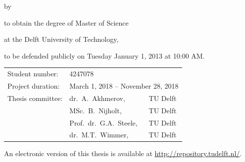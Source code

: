 \begin{titlepage}


\begin{center}


{\makeatletter
\largetitlestyle\fontsize{64}{94}\selectfont\@title
\makeatother}

{\makeatletter
\ifx\@subtitle\undefined\else
    \bigskip
   {\tudsffamily\fontsize{22}{32}\selectfont\@subtitle}    
\fi
\makeatother}

\bigskip
\bigskip

by

\bigskip
\bigskip

{\makeatletter
\largetitlestyle\fontsize{26}{26}\selectfont\@author
\makeatother}

\bigskip
\bigskip

to obtain the degree of Master of Science

at the Delft University of Technology,

to be defended publicly on Tuesday January 1, 2013 at 10:00 AM.

\vfill

\begin{tabular}{lll}
    Student number: & 4247078 \\
    Project duration: & \multicolumn{2}{l}{March 1, 2018 -- November 28, 2018} \\
    Thesis committee: & dr.\ A.\ Akhmerov, & TU Delft \\
                      & MSc.\ B.\ Nijholt, & TU Delft\\
                      & Prof.\ dr.\ G.A.\ Steele, & TU Delft \\
                      & dr.\ M.T.\ Wimmer, & TU Delft \\
\end{tabular}

\bigskip
\bigskip

An electronic version of this thesis is available at \url{http://repository.tudelft.nl/}.


\end{center}
\end{titlepage}

